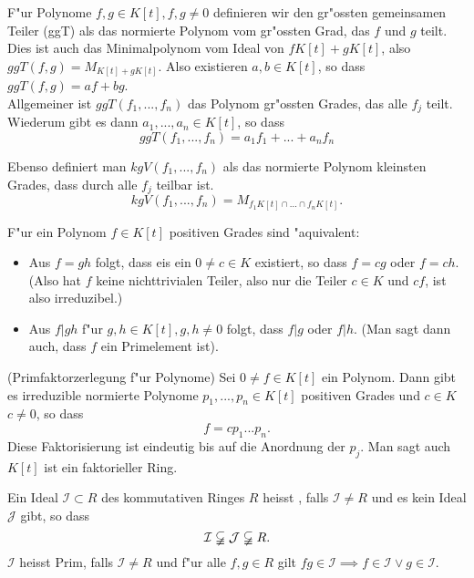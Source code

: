 \documentclass[9pt, a4paper, twocolumn, landscape]{article}
\begin{document}
{ 
 \begin{definition}
 F"ur Polynome $f, g \in K[t], f, g \neq 0$ definieren wir den gr"ossten gemeinsamen Teiler (ggT) als das normierte Polynom vom gr"ossten Grad, das $f$ und $g$ teilt. Dies ist auch das Minimalpolynom vom Ideal von $f K[t] + g K[t]$, also $ggT(f, g) = M_{ K[t] + g K[t]}.$
 Also existieren $a, b \in K[t]$, so dass $ggT(f, g) = af + bg$.
 \\
 Allgemeiner ist $ggT(f_1, ..., f_n)$ das Polynom gr"ossten Grades, das alle $f_j$ teilt. Wiederum gibt es dann $a_1, ..., a_n \in K[t]$, so dass 
 $$
 ggT(f_1, ..., f_n) = a_1 f_1 + ... + a_n f_n
 $$
 
 Ebenso definiert man $kgV(f_1, ..., f_n)$ als das normierte Polynom kleinsten Grades, dass durch alle $f_j$ teilbar ist. 
 $$
 kgV(f_1, ..., f_n) = M_{f_1K[t] \cap ... \cap f_n K[t]}.$$
 \end{definition}
 
 \begin{lemma}
 F"ur ein Polynom $f \in K[t]$ positiven Grades sind "aquivalent:
\begin{itemize}
\item Aus $f = gh$ folgt, dass eis ein $0 \neq c \in K$ existiert, so dass $f = cg$ oder $f = ch$. (Also hat $f$ keine nichttrivialen Teiler, also nur die Teiler $c \in K$ und $cf$, ist also irreduzibel.)
\item Aus $f|gh$ f"ur $g, h \in K[t], g, h \neq 0$ folgt, dass $f|g$ oder $f|h$. (Man sagt dann auch, dass $f$ ein Primelement ist).
\end{itemize}
 \end{lemma}
 
 
 
 \begin{theorem} (Primfaktorzerlegung f"ur Polynome)
 Sei $0 \neq f \in K[t]$ ein Polynom. Dann gibt es irreduzible normierte Polynome $p_1, ..., p_n \in K[t]$ positiven Grades und $c \in K$ $c\neq 0$, so dass
 $$
 f = cp_1 ... p_n.
 $$
 Diese Faktorisierung ist eindeutig bis auf die Anordnung der $p_j$.
 Man sagt auch $K[t]$ ist ein faktorieller Ring.
 \end{theorem}
 
 
 
 \begin{definition}
 Ein Ideal $\mathcal{I} \subset R$ des kommutativen Ringes $R$ heisst , falls $\mathcal{I} \neq R$ und es kein Ideal $\mathcal{J}$ gibt, so dass 
 $$
\mathcal{I} \varsubsetneqq \mathcal{J} \varsubsetneqq R.
 $$
 $\mathcal{I}$ heisst Prim, falls $\mathcal{I} \neq R$ und f"ur alle $f, g \in R$ gilt $fg \in \mathcal{I} \implies
  f \in \mathcal{I} \vee g \in \mathcal{I}$.
 \end{definition}
 
}
\end{document}
